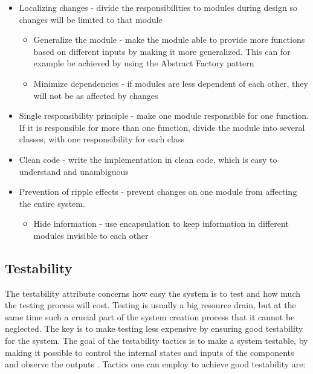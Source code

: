 \begin{itemize}
	\item Localizing changes - divide the responsibilities to modules during design so changes will be limited to that module
        \begin{itemize}
	\item Generalize the module - make the module able to provide more functions based on different inputs by making it more generalized. This can for example be achieved by using the Abstract Factory pattern
	\item Minimize dependencies - if modules are less dependent of each other, they will not be as affected by changes
	\end{itemize}
	\item Single responsibility principle - make one module responsible for one function. If it is responsible for more than one function, divide the module into several classes, with one responsibility for each class
	\item Clean code - write the implementation in clean code, which is easy to understand and unambiguous
	\item Prevention of ripple effects - prevent changes on one module from affecting the entire system.
        \begin{itemize}
	\item Hide information - use encapsulation to keep information in different modules invisible to each other
        \end{itemize}
\end{itemize}


\subsection{Testability}
The testability attribute concerns how easy the system is to test and how much the testing process will cost. Testing is usually a big resource drain, but at the same time such a crucial part of the system creation process that it cannot be neglected. The key is to make testing less expensive by ensuring good testability for the system. The goal of the testability tactics is to make a system testable, by making it possible to control the internal states and inputs of the components and observe the outputs \cite{bass2003software}. Tactics one can employ to achieve good testability are: 

